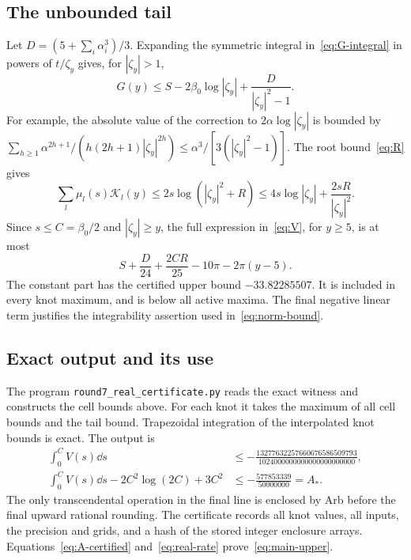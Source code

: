 \subsection{The unbounded tail}
Let $D=(5+\sum_i\alpha_i^3)/3$.  Expanding the symmetric integral
in~\eqref{eq:G-integral} in powers of $t/\zeta_y$ gives, for
$|\zeta_y|>1$,
\begin{equation}\label{eq:G-tail}
 G(y)\le S-2\beta_0\log|\zeta_y|
                         +\frac{D}{|\zeta_y|^2-1}.
\end{equation}
For example, the absolute value of the correction to
$2\alpha\log|\zeta_y|$ is bounded by
$\sum_{h\ge1}\alpha^{2h+1}/(h(2h+1)|\zeta_y|^{2h})
\le\alpha^3/[3(|\zeta_y|^2-1)]$.
The root bound~\eqref{eq:R} gives
\[
 \sum_l\mu_l(s)\mathcal K_l(y)
 \le2s\log(|\zeta_y|^2+R)
 \le4s\log|\zeta_y|+\frac{2sR}{|\zeta_y|^2}.
\]
Since $s\le C=\beta_0/2$ and $|\zeta_y|\ge y$, the full expression
in~\eqref{eq:V}, for $y\ge5$, is at most
\begin{equation}\label{eq:tail-constant}
 S+\frac D{24}+\frac{2CR}{25}-10\pi-2\pi(y-5).
\end{equation}
The constant part has the certified upper bound $-33.82285507$.
It is included in every knot maximum, and is below all active maxima.
The final negative linear term justifies the integrability assertion
used in~\eqref{eq:norm-bound}.

\subsection{Exact output and its use}
The program \texttt{round7\_real\_certificate.py} reads the exact
witness and constructs the cell bounds above.  For each knot it takes
the maximum of all cell bounds and the tail bound.  Trapezoidal
integration of the interpolated knot bounds is exact.  The output is
\begin{align}
 \int_0^C V(s)\dd s
 &\le-\frac{13277632257660676586509793}
                 {1024000000000000000000000},\label{eq:V-integral}\\
 \int_0^CV(s)\dd s-2C^2\log(2C)+3C^2
 &\le-\frac{577853339}{50000000}=A_*.
 \label{eq:A-certified}
\end{align}
The only transcendental operation in the final line is enclosed by
Arb before the final upward rational rounding.  The certificate records
all knot values, all inputs, the precision and grids, and a hash of
the stored integer enclosure arrays.  Equations~\eqref{eq:A-certified}
and~\eqref{eq:real-rate} prove~\eqref{eq:main-upper}.
